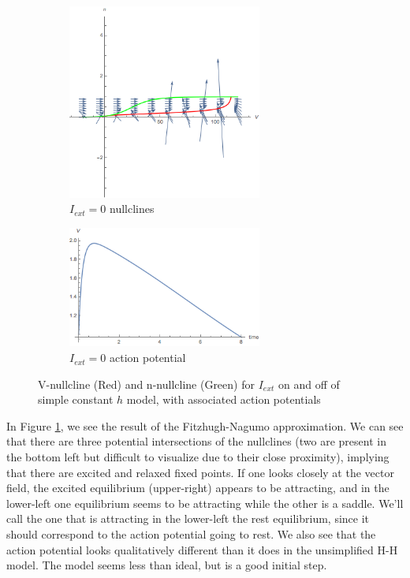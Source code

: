 \documentclass[12]{book}
\newcommand\0{\mathbf{0}}
\newcommand\<{\langle}
\renewcommand\>{\rangle}
\begin{document}
\begin{figure}[H]
\centering
\begin{subfigure}{0.7\textwidth}
	\centering
	\includegraphics[width=0.7\textwidth]{fastFast_nullc.png}
	\caption{$I_{ext}=0$ nullclines}
\end{subfigure}
\begin{subfigure}{0.7\textwidth}
	\centering
	\includegraphics[width=0.7\textwidth]{fastFast.png}
	\caption{$I_{ext}=0$ action potential}
\end{subfigure}
	\caption{V-nullcline (Red) and n-nullcline (Green) for $I_{ext}$ on and off of simple constant $h$ model, with associated action potentials}
	\label{fig:first}
\end{figure}

In Figure \ref{fig:first}, we see the result of the Fitzhugh-Nagumo approximation. We can see that there are three potential intersections of the nullclines (two are present in the bottom left but difficult to visualize due to their close proximity), implying that there are excited and relaxed fixed points. If one looks closely at the vector field, the excited equilibrium (upper-right) appears to be attracting, and in the lower-left one equilibrium seems to be attracting while the other is a saddle. We'll call the one that is attracting in the lower-left the rest equilibrium, since it should correspond to the action potential going to rest. We also see that the action potential looks qualitatively different than it does in the unsimplified H-H model. The model seems less than ideal, but is a good initial step. 
\end{document}
